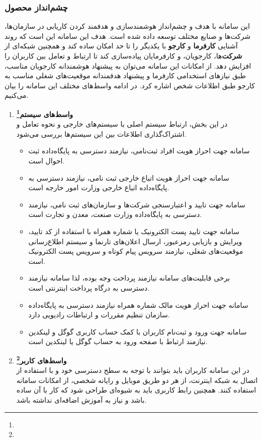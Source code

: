 \documentclass[12pt]{article}
\begin{document}
	\subsubsection{چشم‌انداز محصول}
	این سامانه با هدف و چشم‌انداز هوشمند‌سازی و هدفمند کردن کاریابی در سازمان‌ها، شرکت‌ها و صنایع مختلف توسعه داده شده است. هدف این سامانه این است که روند آشنایی \textbf{کارفرما} و \textbf{کارجو} با یکدیگر را تا حد امکان ساده کند و همچنین شبکه‌ای از \textbf{شرکت}‌ها، کارجویان، و کارفرمایان پیاده‌سازی کند تا ارتباط و تعامل بین کاربران را افزایش دهد. از امکانات این سامانه می‌توان به پیشنهاد هوشمندانه کارجویان مناسب، طبق نیاز‌های استخدامی کارفرما و پیشنهاد هدفمندانه موقعیت‌های شغلی مناسب به کارجو طبق اطلاعات شخص اشاره کرد.
	در ادامه واسط‌های مختلف این سامانه را بیان می‌کنیم.
	\begin{enumerate}
		\item
		\textbf{واسط‌های سیستم\footnote{}}\\
		در این بخش، ارتباط سیستم اصلی با سیستم‌های خارجی و نحوه تعامل و اشتراک‌گذاری اطلاعات بین این سیستم‌ها بررسی می‌شود.
		\begin{itemize}
			\item
			سامانه جهت احراز هویت افراد ثبت‌نامی، نیازمند دسترسی به پایگاه‌داده ثبت احوال است.
			\item
			سامانه جهت احراز هویت اتباع خارجی ثبت نامی، نیازمند دسترسی به پایگاه‌داده اتباع خارجی وزارت امور خارجه است.
			\item
			سامانه جهت تایید و اعتبارسنجی شرکت‌ها و سازمان‌‌های ثبت نامی، نیازمند دسترسی به پایگاه‌داده وزارت صنعت، معدن و تجارت است.
			\item
			سامانه جهت تایید پست الکترونیک یا شماره همراه با استفاده از کد تایید، ویرایش و بازیابی رمز‌عبور، ارسال اعلان‌های تارنما و سیستم اطلاع‌رسانی موقعیت‌های شغلی،‌ نیازمند سرویس پیام کوتاه و سرویس پست الکترونیک است.
			\item
			برخی قابلیت‌های سامانه نیازمند پرداخت وجه بوده، لذا سامانه نیازمند دسترسی به درگاه پرداخت اینترنتی است.
			\item
			سامانه جهت احراز هویت مالک شماره همراه نیازمند دسترسی به پایگاه‌داده سازمان تنظیم مقررات و ارتباطات رادیویی دارد.
			\item
			سامانه جهت ورود و ثبت‌نام کاربران با کمک حساب کاربری گوگل و لینکدین نیازمند ارتباط با صفحه ورود به حساب گوگل یا لینکدین است.
		\end{itemize}
		\item
		\textbf{واسط‌های کاربر\footnote{}}\\
		در این سامانه کاربران باید بتوانند با توجه به سطح دسترسی خود و با استفاده از اتصال به شبکه اینترنت، از هر دو طریق موبایل و رایانه شخصی، از امکانات سامانه استفاده کنند. همچنین رابط کاربری باید به شیوه‌ای طراحی شود که کار با آن ساده باشد و نیاز به آموزش اضافه‌ای نداشته باشد.


\end{enumerate}
\end{document}

